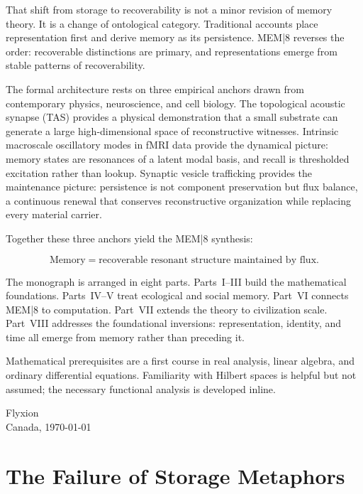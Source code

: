 \documentclass[12pt, oneside]{book}
\theoremstyle{plain}
\theoremstyle{definition}
\theoremstyle{remark}
\begin{document}
That shift from storage to recoverability is not a minor
revision of memory theory.
It is a change of ontological category.
Traditional accounts place representation first and derive
memory as its persistence.
MEM|8 reverses the order:
recoverable distinctions are primary, and representations emerge
from stable patterns of recoverability.

The formal architecture rests on three empirical anchors
drawn from contemporary physics, neuroscience, and cell biology.
The topological acoustic synapse (TAS) provides a
physical demonstration that a small substrate can generate
a large high-dimensional space of reconstructive witnesses.
Intrinsic macroscale oscillatory modes in fMRI data provide
the dynamical picture: memory states are resonances of
a latent modal basis, and recall is thresholded excitation
rather than lookup.
Synaptic vesicle trafficking provides the maintenance picture:
persistence is not component preservation but flux balance,
a continuous renewal that conserves reconstructive organization
while replacing every material carrier.

Together these three anchors yield the MEM|8 synthesis:

\[
  \boxed{\;
    \text{Memory}
    =
    \text{recoverable resonant structure maintained by flux}.
  \;}
\]

The monograph is arranged in eight parts.
Parts~I--III build the mathematical foundations.
Parts~IV--V treat ecological and social memory.
Part~VI connects MEM|8 to computation.
Part~VII extends the theory to civilization scale.
Part~VIII addresses the foundational inversions:
representation, identity, and time all emerge from memory
rather than preceding it.

Mathematical prerequisites are a first course in real analysis,
linear algebra, and ordinary differential equations.
Familiarity with Hilbert spaces is helpful but not assumed;
the necessary functional analysis is developed inline.

\bigskip
\noindent
Flyxion\\
Canada, \today

\mainmatter

\part{The Failure of Storage Metaphors}
\end{document}
